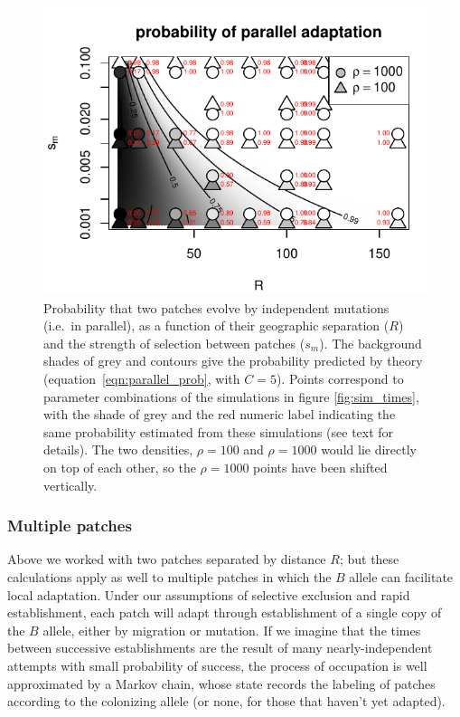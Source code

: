 \documentclass{article}
\begin{document}
\begin{figure}[ht!]
  \begin{center}
      \includegraphics{prob-mutation-compared}
  \end{center}
  \caption{
      Probability that two patches 
      evolve by independent mutations (i.e.\ in parallel),
      as a function of their geographic separation ($R$)
      and the strength of selection between patches ($s_m$).
      The background shades of grey and contours
      give the probability predicted by theory (equation~\eqref{eqn:parallel_prob}, with $C=5$).
      Points correspond to parameter combinations of the simulations in figure \ref{fig:sim_times},
      with the shade of grey and the red numeric label indicating the same probability
      estimated from these simulations (see text for details).
      The two densities, $\rho=100$ and $\rho=1000$ would lie directly on top of each other, so the $\rho=1000$ points have been shifted vertically.
  }   \label{fig:sim_probs}
\end{figure}

\subsubsection{Multiple patches}
Above we worked with two patches separated by distance $R$;
but these calculations apply as well to multiple patches
in which the $B$ allele can facilitate local adaptation. 
Under our assumptions of selective exclusion and rapid establishment, 
each patch will adapt through establishment of a single copy of the $B$ allele, 
either by migration or mutation.
If we imagine that the times between successive establishments are the result of many nearly-independent attempts
with small probability of success,
the process of occupation is well approximated by a Markov chain,
whose state records the labeling of patches according to the colonizing allele
(or none, for those that haven't yet adapted).
\end{document}

